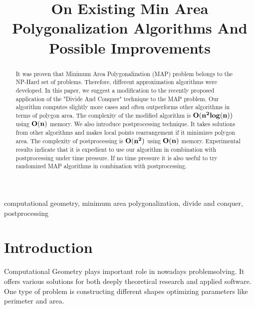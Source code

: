 \documentclass[conference]{IEEEtran}
\begin{document}
	\title{On Existing Min Area Polygonalization Algorithms And Possible Improvements\\}
	
	\author{
	}
	
	\maketitle
	
	\begin{abstract}
		It was proven that Minimum Area Polygonalization (MAP) problem belongs to the NP-Hard set of problems.
		Therefore, different approximation algorithms were developed.
		In this paper, we suggest a modification to the recently proposed application of the "Divide And Conquer" technique to the MAP problem.
		Our algorithm computes slightly more cases and often outperforms other algorithms in terms of polygon area.
		The complexity of the modified algorithm is $\bold{O(n^{2}log(n))}$ using $\bold{O(n)}$ memory.
		We also introduce postprocessing technique.
		It takes solutions from other algorithms and makes local points rearrangement if it minimizes polygon area.
		The complexity of postprocessing is $\bold{O(n^{2})}$ using $\bold{O(n)}$ memory.
		Experimental results indicate that it is expedient to use our algorithm in combination with postprocessing under time pressure.
		If no time pressure it is also useful to try randomized MAP algorithms in combination with postprocessing.
	\end{abstract}
	
	\begin{IEEEkeywords}
		computational geometry, minimum area polygonalization, divide and conquer, postprocessing
	\end{IEEEkeywords}
	
	
	\section{Introduction}
	\label{S1}
		Computational Geometry plays important role in nowadays problemsolving.
		It offers various solutions for both deeply theoretical research and applied software.
		One type of problem is constructing different shapes optimizing parameters like perimeter and area.
		
\end{document}
